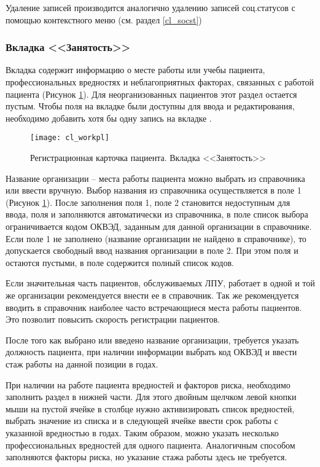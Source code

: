 Удаление записей производится аналогично удалению записей соц.статусов с помощью контекстного меню (см. раздел \ref{cl_socst})

\subsubsection{Вкладка <<Занятость>>}

Вкладка  содержит информацию о месте работы или учебы пациента, профессиональных вредностях и неблагоприятных факторах, связанных с работой пациента (Рисунок \ref{img_cl_workpl}). Для неорганизованных пациентов этот раздел остается пустым. Чтобы поля на вкладке  были доступны для ввода и редактирования, необходимо добавить хотя бы одну запись на вкладке .

\begin{figure}[ht]\centering
 \texttt{[image: cl\_workpl]}
 \caption{Регистрационная карточка пациента. Вкладка <<Занятость>>}
 \label{img_cl_workpl}
\end{figure} 

Название организации – места работы пациента можно выбрать из справочника или ввести вручную. Выбор названия из справочника осуществляется в поле 1 (Рисунок \ref{img_cl_workpl}). После заполнения поля 1, поле 2 становится недоступным для ввода, поля  и  заполняются автоматически из справочника, в поле  список выбора ограничивается кодом ОКВЭД, заданным для данной организации в справочнике. Если поле 1 не заполнено (название организации не найдено в справочнике), то допускается свободный ввод названия организации в поле 2. При этом поля  и  остаются пустыми, в поле  содержится полный список кодов.

\begin{prim}
Если значительная часть пациентов, обслуживаемых ЛПУ, работает в одной и той же организации рекомендуется внести ее в справочник. Так же рекомендуется вводить в справочник наиболее часто встречающиеся места работы пациентов. Это позволит повысить скорость регистрации пациентов.
\end{prim}
 
После того как выбрано или введено название организации, требуется указать должность пациента, при наличии информации выбрать код ОКВЭД и ввести стаж работы на данной позиции в годах. 

При наличии на работе пациента вредностей и факторов риска, необходимо заполнить раздел  в нижней части. Для этого двойным щелчком левой кнопки мыши на пустой ячейке в столбце  нужно активизировать список вредностей, выбрать значение из списка и в следующей ячейке ввести срок работы с указанной вредностью в годах. Таким образом, можно указать несколько профессиональных вредностей для одного пациента. Аналогичным способом заполняются факторы риска, но указание стажа работы здесь не требуется.

